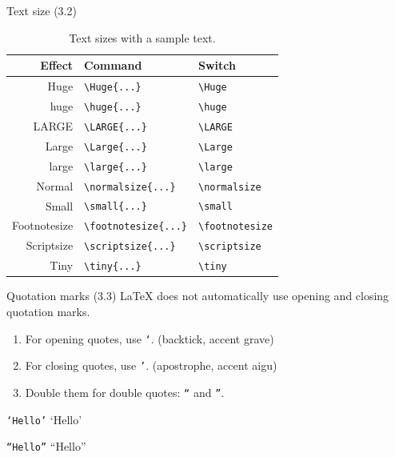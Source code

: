 \documentclass{beamer}
\newcommand{\switch}[1]{\texttt{\textbackslash#1}}
\newcommand{\command}[2]{\texttt{\textbackslash#1\{#2\}}}
\begin{document}
\begin{frame}{Text size (3.2)}
    \begin{table}[ht]
        \centering
        \begin{tabular}{rll}
            \toprule
            {\bfseries Effect}          & {\bfseries Command}         & {\bfseries Switch}    \\
            \midrule
            \Huge{Huge}                 & \command{Huge}{...}         & \switch{Huge}         \\
            \huge{huge}                 & \command{huge}{...}         & \switch{huge}         \\
            \LARGE{LARGE}               & \command{LARGE}{...}        & \switch{LARGE}        \\
            \Large{Large}               & \command{Large}{...}        & \switch{Large}        \\
            \large{large}               & \command{large}{...}        & \switch{large}        \\
            \normalsize{Normal}         & \command{normalsize}{...}   & \switch{normalsize}   \\
            \small{Small}               & \command{small}{...}        & \switch{small}        \\
            \footnotesize{Footnotesize} & \command{footnotesize}{...} & \switch{footnotesize} \\
            \scriptsize{Scriptsize}     & \command{scriptsize}{...}   & \switch{scriptsize}   \\
            \tiny{Tiny}                 & \command{tiny}{...}         & \switch{tiny}         \\
            \bottomrule
        \end{tabular}
        \caption{Text sizes with a sample text.}\label{tbltextsize}
    \end{table}
\end{frame}

\begin{frame}{Quotation marks (3.3)}
    \LaTeX{} does not automatically use opening and closing quotation marks.

    \medskip

    \begin{enumerate}
        \item For opening quotes, use \texttt{`}. \hfill (backtick, accent grave)
        \item For closing quotes, use \texttt{'}. \hfill (apostrophe, accent aigu)
        \item Double them for double quotes: \texttt{``} and \texttt{''}.
    \end{enumerate}

    \medskip

    \begin{center}
        \large
        \texttt{`Hello'} \textrightarrow{} `Hello'

        \texttt{``Hello''} \textrightarrow{} ``Hello''
    \end{center}
\end{frame}
\end{document}
